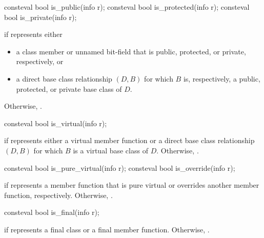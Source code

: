 %
%
%
\begin{itemdecl}
consteval bool is_public(info r);
consteval bool is_protected(info r);
consteval bool is_private(info r);
\end{itemdecl}

\begin{itemdescr}
\pnum
\returns
{} if  represents either
\begin{itemize}
\item
  a class member or unnamed bit-field
  that is public, protected, or private, respectively, or
\item
  a direct base class relationship $(D, B)$ for which $B$ is, respectively,
  a public, protected, or private base class of $D$.
\end{itemize}
Otherwise, .
\end{itemdescr}

%
\begin{itemdecl}
consteval bool is_virtual(info r);
\end{itemdecl}

\begin{itemdescr}
\pnum
\returns
{} if  represents either a virtual member function
or a direct base class relationship $(D, B)$
for which $B$ is a virtual base class of $D$.
Otherwise, .
\end{itemdescr}

%
%
\begin{itemdecl}
consteval bool is_pure_virtual(info r);
consteval bool is_override(info r);
\end{itemdecl}

\begin{itemdescr}
\pnum
\returns
{} if  represents a member function that is pure virtual
or overrides another member function, respectively.
Otherwise, .
\end{itemdescr}

%
\begin{itemdecl}
consteval bool is_final(info r);
\end{itemdecl}

\begin{itemdescr}
\pnum
\returns
{} if  represents a final class or a final member function.
Otherwise, .
\end{itemdescr}

